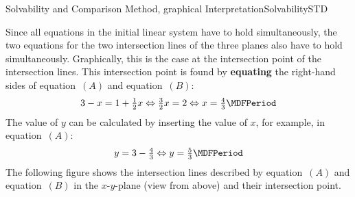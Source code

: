 \begin{MXContent}{Solvability and Comparison Method, graphical Interpretation}{Solvability}{STD}
\begin{MExample}
\begin{center}
{
}%
\end{center}
Since all equations in the initial linear system have to hold simultaneously, 
the two equations for the two intersection lines of the three planes also have to hold 
simultaneously. Graphically, this is the case at the intersection point of the intersection 
lines. This intersection point is found by \textbf{equating} the right-hand sides of 
equation~$(A)$ and equation~$(B)$:
$$3 - x = 1 + \Mtfrac12 x \Leftrightarrow \Mtfrac32 x = 2 \Leftrightarrow x = \Mtfrac43 \MDFPeriod $$
The value of $y$ can be calculated by inserting the value of $x$, for example, 
in equation~$(A)$:
$$y = 3 - \Mtfrac43 \Leftrightarrow y = \Mtfrac53 \MDFPeriod $$
The following figure shows the intersection lines described by equation~$(A)$ and 
equation~$(B)$ in the $x$-$y$-plane (view from above) and their intersection point.



\end{MExample}
\end{MXContent}
